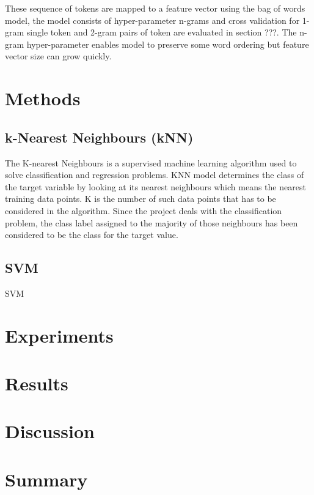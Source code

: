 \documentclass[transmag]{IEEEtran}
\begin{document}
These sequence of tokens are mapped to a feature vector using the bag of words model, the model consists of hyper-parameter n-grams and cross validation for 1-gram single token and 2-gram pairs of token are evaluated in section ???. The n-gram hyper-parameter enables model to preserve some word ordering but feature vector size can grow quickly.

\section{Methods}

\subsection{k-Nearest Neighbours (kNN)}
The K-nearest Neighbours is a supervised machine learning algorithm used to solve classification and regression problems. KNN model determines the class of the target variable by looking at its nearest neighbours which means the nearest training data points. K is the number of such data points that has to be considered in the algorithm. Since the project deals with the classification problem, the class label assigned to the majority of those neighbours has been considered to be the class for the target value.

\subsection{SVM}
SVM 

\subsection{}

\section{Experiments}

\section{Results}

\section{Discussion}

\section{Summary}












\end{document}
